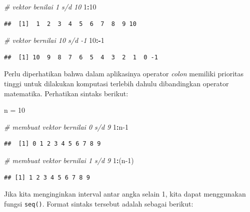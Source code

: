 \documentclass[
]{book}
\newenvironment{Shaded}{\begin{snugshade}}{\end{snugshade}}
\newcommand{\CommentTok}[1]{\textcolor[rgb]{0.56,0.35,0.01}{\textit{#1}}}
\newcommand{\DecValTok}[1]{\textcolor[rgb]{0.00,0.00,0.81}{#1}}
\newcommand{\NormalTok}[1]{#1}
\newcommand{\OtherTok}[1]{\textcolor[rgb]{0.56,0.35,0.01}{#1}}
\newcommand{\SpecialCharTok}[1]{\textcolor[rgb]{0.81,0.36,0.00}{\textbf{#1}}}
\theoremstyle{definition}
\theoremstyle{definition}
\theoremstyle{definition}
\theoremstyle{definition}
\theoremstyle{remark}
\begin{document}
\begin{Shaded}
\begin{Highlighting}[]
\CommentTok{\# vektor benilai 1 s/d 10}
\DecValTok{1}\SpecialCharTok{:}\DecValTok{10}
\end{Highlighting}
\end{Shaded}

\begin{verbatim}
##  [1]  1  2  3  4  5  6  7  8  9 10
\end{verbatim}

\begin{Shaded}
\begin{Highlighting}[]
\CommentTok{\# vektor bernilai 10 s/d {-}1}
\DecValTok{10}\SpecialCharTok{:{-}}\DecValTok{1}
\end{Highlighting}
\end{Shaded}

\begin{verbatim}
##  [1] 10  9  8  7  6  5  4  3  2  1  0 -1
\end{verbatim}

Perlu diperhatikan bahwa dalam aplikasinya operator \emph{colon} memiliki prioritas tinggi untuk dilakukan komputasi terlebih dahulu dibandingkan operator matematika. Perhatikan sintaks berikut:

\begin{Shaded}
\begin{Highlighting}[]
\NormalTok{n }\OtherTok{=} \DecValTok{10}

\CommentTok{\# membuat vektor bernilai 0 s/d 9}
\DecValTok{1}\SpecialCharTok{:}\NormalTok{n}\DecValTok{{-}1}
\end{Highlighting}
\end{Shaded}

\begin{verbatim}
##  [1] 0 1 2 3 4 5 6 7 8 9
\end{verbatim}

\begin{Shaded}
\begin{Highlighting}[]
\CommentTok{\# membuat vektor bernilai 1 s/d 9}
\DecValTok{1}\SpecialCharTok{:}\NormalTok{(n}\DecValTok{{-}1}\NormalTok{)}
\end{Highlighting}
\end{Shaded}

\begin{verbatim}
## [1] 1 2 3 4 5 6 7 8 9
\end{verbatim}

Jika kita menginginkan interval antar angka selain 1, kita dapat menggunakan fungsi \texttt{seq()}. Format sintaks tersebut adalah sebagai berikut:
\end{document}
